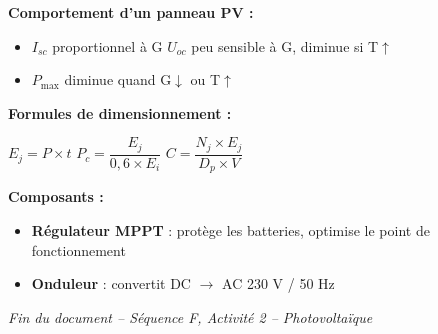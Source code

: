 \documentclass[a4paper, 11pt, oneside]{article}
\begin{document}
\begin{tcolorbox}[colback=cyancol!10, colframe=teal, title=\textcolor{teal}{\textbf{À retenir -- Formules clés}}]

\textbf{Comportement d'un panneau PV :}
\begin{itemize}
  \item $I_{sc}$ proportionnel à G \quad \textbullet \quad $U_{oc}$ peu sensible à G, diminue si T$\uparrow$
  \item $P_{\max}$ diminue quand G$\downarrow$ ou T$\uparrow$
\end{itemize}

\vspace{0.4cm}
\textbf{Formules de dimensionnement :}
\begin{center}
$E_j = P \times t$ \qquad
$P_c = \dfrac{E_j}{0{,}6 \times E_i}$ \qquad
$C = \dfrac{N_j \times E_j}{D_p \times V}$
\end{center}

\vspace{0.4cm}
\textbf{Composants :}
\begin{itemize}
  \item \textbf{Régulateur MPPT} : protège les batteries, optimise le point de fonctionnement
  \item \textbf{Onduleur} : convertit DC $\rightarrow$ AC 230 V / 50 Hz
\end{itemize}
\end{tcolorbox}

\vfill

\begin{center}
\textit{Fin du document -- Séquence F, Activité 2 -- Photovoltaïque}
\end{center}
\end{document}
